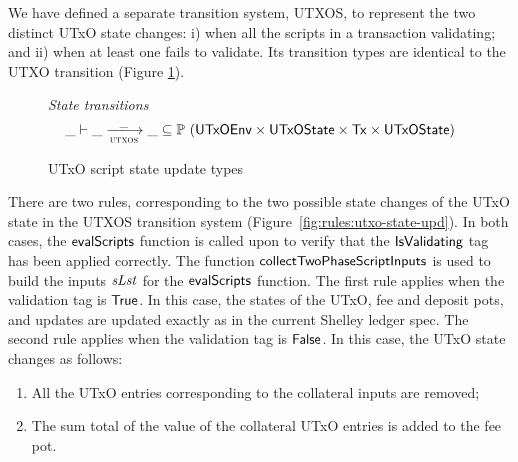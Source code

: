 We have defined a separate transition system, UTXOS, to represent the two distinct
UTxO state changes: i) when all the scripts in a transaction validating; and
ii) when at least one fails to validate. Its transition types
are identical to the UTXO transition (Figure
\ref{fig:ts-types:utxo-scripts}).

\begin{figure}[htb]
  \emph{State transitions}
  \begin{equation*}
    \_ \vdash
    \var{\_} \trans{utxos}{\_} \var{\_}
    \subseteq \powerset (\UTxOEnv \times \UTxOState \times \Tx \times \UTxOState)
  \end{equation*}
  \caption{UTxO script state update types}
  \label{fig:ts-types:utxo-scripts}
\end{figure}

There are two rules, corresponding to the two possible state changes of the
UTxO state in the UTXOS transition system (Figure~\ref{fig:rules:utxo-state-upd}).
%
In both cases, the $\mathsf{evalScripts}$ function is called upon to verify that the $\mathsf{IsValidating}$
tag has been applied correctly. The function $\mathsf{collectTwoPhaseScriptInputs}$ is used to build
the inputs $\mathit{sLst}$ for the $\mathsf{evalScripts}$ function.
%
The first rule
applies when the validation tag is $\mathsf{True}$.
In this case, the states of the UTxO, fee
  and deposit pots, and updates are updated exactly as in the current Shelley
  ledger spec.
%
  The second rule
  applies when the validation tag is $\mathsf{False}$.
  In this case, the UTxO state changes as follows:

  \begin{enumerate}
    \item All the
    UTxO entries corresponding to the collateral inputs are removed;

    \item The sum total of the value of the collateral UTxO entries
    is added to the fee pot.
  \end{enumerate}


